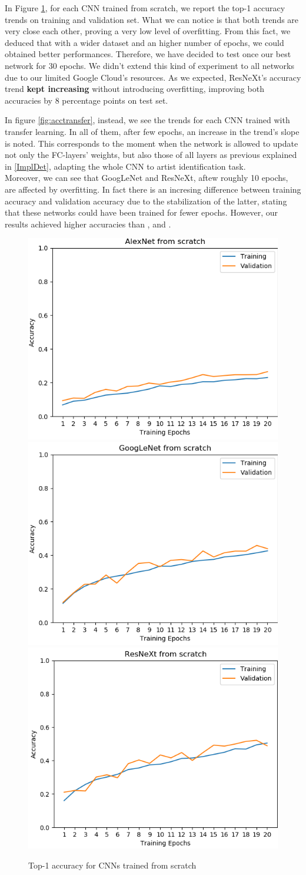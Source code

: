 \documentclass{article}
\begin{document}
In Figure \ref{fig:accscratch}, for each CNN trained from scratch,  we report the top-1 accuracy trends on training and validation set. What we can notice is that both trends are very close each other, proving a very low level of overfitting.
From this fact, we deduced that with a wider dataset and an higher number of epochs, we could obtained better performances. Therefore, we have decided to test once our best network for 30 epochs. We didn't extend this kind of experiment to all networks due to our limited Google Cloud's resources. As we expected, ResNeXt's accuracy trend \textbf{kept increasing} without introducing overfitting, improving both accuracies by 8 percentage points on test set.

In figure \ref{fig:acctransfer}, instead, we see the trends for each CNN trained with transfer learning. In all of them, after few epochs, an increase in the trend's slope is noted. This corresponds to the moment when the network is allowed to update not only the FC-layers' weights, but also those of all layers as previous explained in \ref{ImplDet}, adapting the whole CNN to artist identification task.\\
Moreover, we can see that GoogLeNet and ResNeXt, aftew roughly 10 epochs, are affected by overfitting. In fact there is an incresing difference between training accuracy and validation accuracy due to the stabilization of the latter, stating that these networks could have been trained for fewer epochs.  However, our results achieved higher accuracies than \cite{ArtistIdCNN406}, \cite{Saleh2015} and \cite{mensink2014}.


\begin{figure}[htp]
	
	\centering
	\includegraphics[width=.33\textwidth]{graphs/alex_scratch}\hfill
	\includegraphics[width=.33\textwidth]{graphs/google_scratch}\hfill
	\includegraphics[width=.33\textwidth]{graphs/res_scratch}
	
	\caption{Top-1 accuracy for CNNs trained from scratch}
	\label{fig:accscratch}
	
\end{figure}
\end{document}
